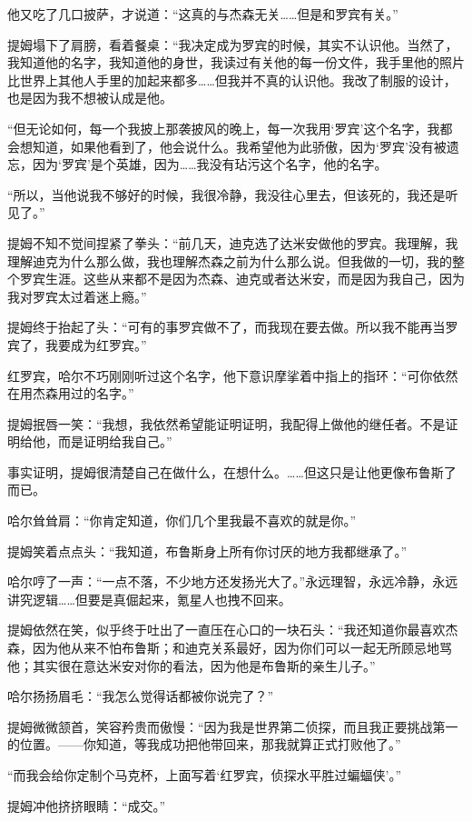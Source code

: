 \documentclass[../main]{subfiles}
\begin{document}
他又吃了几口披萨，才说道：“这真的与杰森无关……但是和罗宾有关。”

提姆塌下了肩膀，看着餐桌：“我决定成为罗宾的时候，其实不认识他。当然了，我知道他的名字，我知道他的身世，我读过有关他的每一份文件，我手里他的照片比世界上其他人手里的加起来都多……但我并不真的认识他。我改了制服的设计，也是因为我不想被认成是他。

“但无论如何，每一个我披上那袭披风的晚上，每一次我用‘罗宾’这个名字，我都会想知道，如果他看到了，他会说什么。我希望他为此骄傲，因为‘罗宾’没有被遗忘，因为‘罗宾’是个英雄，因为……我没有玷污这个名字，他的名字。

“所以，当他说我不够好的时候，我很冷静，我没往心里去，但该死的，我还是听见了。”

提姆不知不觉间捏紧了拳头：“前几天，迪克选了达米安做他的罗宾。我理解，我理解迪克为什么那么做，我也理解杰森之前为什么那么说。但我做的一切，我的整个罗宾生涯。这些从来都不是因为杰森、迪克或者达米安，而是因为我自己，因为我对罗宾太过着迷上瘾。”

提姆终于抬起了头：“可有的事罗宾做不了，而我现在要去做。所以我不能再当罗宾了，我要成为红罗宾。”

红罗宾，哈尔不巧刚刚听过这个名字，他下意识摩挲着中指上的指环：“可你依然在用杰森用过的名字。”

提姆抿唇一笑：“我想，我依然希望能证明证明，我配得上做他的继任者。不是证明给他，而是证明给我自己。”

事实证明，提姆很清楚自己在做什么，在想什么。……但这只是让他更像布鲁斯了而已。

哈尔耸耸肩：“你肯定知道，你们几个里我最不喜欢的就是你。”

提姆笑着点点头：“我知道，布鲁斯身上所有你讨厌的地方我都继承了。”

哈尔哼了一声：“一点不落，不少地方还发扬光大了。”永远理智，永远冷静，永远讲究逻辑……但要是真倔起来，氪星人也拽不回来。

提姆依然在笑，似乎终于吐出了一直压在心口的一块石头：“我还知道你最喜欢杰森，因为他从来不怕布鲁斯；和迪克关系最好，因为你们可以一起无所顾忌地骂他；其实很在意达米安对你的看法，因为他是布鲁斯的亲生儿子。”

哈尔扬扬眉毛：“我怎么觉得话都被你说完了？”

提姆微微颔首，笑容矜贵而傲慢：“因为我是世界第二侦探，而且我正要挑战第一的位置。——你知道，等我成功把他带回来，那我就算正式打败他了。”

“而我会给你定制个马克杯，上面写着‘红罗宾，侦探水平胜过蝙蝠侠’。”

提姆冲他挤挤眼睛：“成交。”

~\
\end{document}
